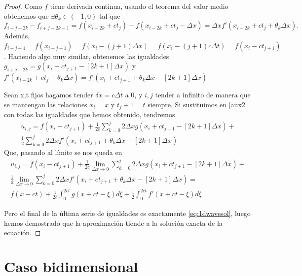 \begin{proof}
	Como $f$ tiene derivada continua, usando el teorema del valor medio obtenemos que $\exists\theta_k\in(-1,0)$ tal que
	\begin{equation*}
		f_{i+j-2k}-f_{i+j-2k-1} = f(x_{i-2k}+ct_j) - f(x_{i-2k}+ct_{j}-\Delta x) = \Delta xf'(x_{i-2k}+ct_j+\theta_k\Delta x).
	\end{equation*} 
	Además, $f_{i-j-1}=f(x_{i-j-1})=f(x_i-(j+1)\Delta x)=f(x_i -(j+1)c\Delta t)=f(x_i-ct_{j+1})$. Haciendo algo muy similar, obtenemos las igualdades $g_{i+j-2k}=g(x_i+ct_{j+1}-[2k+1]\Delta x)$ y $f'(x_{i-2k}+ct_j+\theta_k\Delta x)=f'(x_i+ct_{j+1}+\theta_k\Delta x - [2k+1]\Delta x)$
	
	Sean x,t fijos hagamos tender $\delta x=c\Delta t$ a 0, y $i,j$ tender a infinito de manera que se mantengan las relaciones $x_i=x$ y $t_j+1=t$ siempre.
	Si sustituimos en \ref{aux2} con todas las igualdades que hemos obtenido, tendremos
	\begin{equation*}
	\begin{split}
		u_{i,j} = f(x_i-ct_{j+1}) + \frac{1}{2c}\sum_{k=0}^{j}2\Delta xg(x_i+ct_{j+1}-[2k+1]\Delta x) + \\ \frac{1}{2}\sum_{k=0}^{j}2\Delta xf'(x_i+ct_{j+1} +\theta_k\Delta x - [2k+1]\Delta x)
	\end{split}
	\end{equation*}
	Que, pasando al límite se nos queda en
	\begin{equation*}
	\begin{split}
		u_{i,j} = f(x_i-ct_{j+1}) + \frac{1}{2c}\lim_{\Delta x\rightarrow0}\sum_{k=0}^{j}2\Delta xg(x_i+ct_{j+1}-[2k+1]\Delta x) + \\ \frac{1}{2}\lim_{\Delta x\rightarrow0}\sum_{k=0}^{j}2\Delta xf'(x_i+ct_{j+1} +\theta_k\Delta x - [2k+1]\Delta x) = \\
		f(x-ct) + \frac{1}{2c}\int_{0}^{2ct}g(x+ct-\xi)d\xi + \frac{1}{2}\int_{0}^{2ct}f'(x+ct-\xi)d\xi
	\end{split}
	\end{equation*}
	
	Pero el final de la última serie de igualdades es exactamente \ref{eq:1dwavesol}, luego hemos demostrado que la aproximación tiende a la solución exacta de la ecuación.
\end{proof}

\section{Caso bidimensional}


